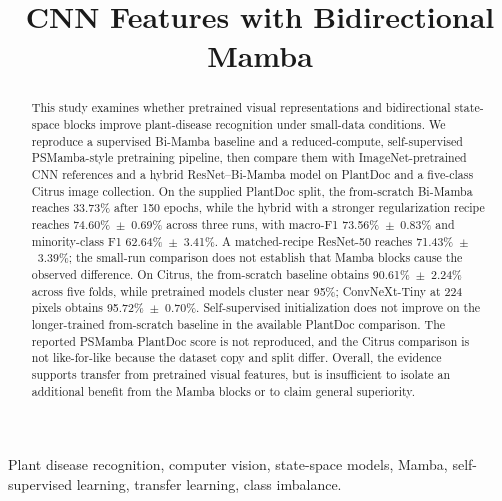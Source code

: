 \documentclass[conference]{IEEEtran}
\begin{document}
\title{CNN Features with Bidirectional Mamba}

\author{
}

\maketitle

\begin{abstract}
This study examines whether pretrained visual representations and bidirectional state-space blocks improve plant-disease recognition under small-data conditions. We reproduce a supervised Bi-Mamba baseline and a reduced-compute, self-supervised PSMamba-style pretraining pipeline, then compare them with ImageNet-pretrained CNN references and a hybrid ResNet--Bi-Mamba model on PlantDoc and a five-class Citrus image collection. On the supplied PlantDoc split, the from-scratch Bi-Mamba reaches 33.73\% after 150 epochs, while the hybrid with a stronger regularization recipe reaches 74.60\%~$\pm$~0.69\% across three runs, with macro-F1 73.56\%~$\pm$~0.83\% and minority-class F1 62.64\%~$\pm$~3.41\%. A matched-recipe ResNet-50 reaches 71.43\%~$\pm$~3.39\%; the small-run comparison does not establish that Mamba blocks cause the observed difference. On Citrus, the from-scratch baseline obtains 90.61\%~$\pm$~2.24\% across five folds, while pretrained models cluster near 95\%; ConvNeXt-Tiny at 224 pixels obtains 95.72\%~$\pm$~0.70\%. Self-supervised initialization does not improve on the longer-trained from-scratch baseline in the available PlantDoc comparison. The reported PSMamba PlantDoc score is not reproduced, and the Citrus comparison is not like-for-like because the dataset copy and split differ. Overall, the evidence supports transfer from pretrained visual features, but is insufficient to isolate an additional benefit from the Mamba blocks or to claim general superiority.
\end{abstract}

\begin{IEEEkeywords}
Plant disease recognition, computer vision, state-space models, Mamba, self-supervised learning, transfer learning, class imbalance.
\end{IEEEkeywords}
\end{document}
